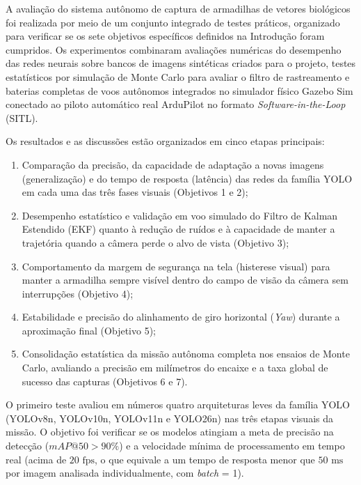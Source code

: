 
A avaliação do sistema autônomo de captura de armadilhas de vetores biológicos foi realizada por meio de um conjunto integrado de testes práticos, organizado para verificar se os sete objetivos específicos definidos na Introdução foram cumpridos. Os experimentos combinaram avaliações numéricas do desempenho das redes neurais sobre bancos de imagens sintéticas criados para o projeto, testes estatísticos por simulação de Monte Carlo para avaliar o filtro de rastreamento e baterias completas de voos autônomos integrados no simulador físico Gazebo Sim conectado ao piloto automático real ArduPilot no formato \textit{Software-in-the-Loop} (SITL).

Os resultados e as discussões estão organizados em cinco etapas principais:
\begin{enumerate}
	\item Comparação da precisão, da capacidade de adaptação a novas imagens (generalização) e do tempo de resposta (latência) das redes da família YOLO em cada uma das três fases visuais (Objetivos 1 e 2);
	\item Desempenho estatístico e validação em voo simulado do Filtro de Kalman Estendido (EKF) quanto à redução de ruídos e à capacidade de manter a trajetória quando a câmera perde o alvo de vista (Objetivo 3);
	\item Comportamento da margem de segurança na tela (histerese visual) para manter a armadilha sempre visível dentro do campo de visão da câmera sem interrupções (Objetivo 4);
	\item Estabilidade e precisão do alinhamento de giro horizontal (\textit{Yaw}) durante a aproximação final (Objetivo 5);
	\item Consolidação estatística da missão autônoma completa nos ensaios de Monte Carlo, avaliando a precisão em milímetros do encaixe e a taxa global de sucesso das capturas (Objetivos 6 e 7).
\end{enumerate}


O primeiro teste avaliou em números quatro arquiteturas leves da família YOLO (YOLOv8n, YOLOv10n, YOLOv11n e YOLO26n) nas três etapas visuais da missão. O objetivo foi verificar se os modelos atingiam a meta de precisão na detecção ($mAP@50 > 90\%$) e a velocidade mínima de processamento em tempo real (acima de $20\text{ fps}$, o que equivale a um tempo de resposta menor que $50\text{ ms}$ por imagem analisada individualmente, com \textit{batch} = 1).

